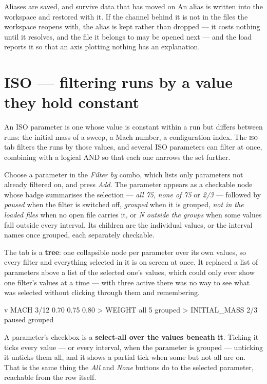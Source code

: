 \documentclass[11pt,a4paper,oneside]{report}
\newcommand{\tab}[1]{\textsc{#1}}
\begin{document}
\begin{aoenote}{Aliases are saved, and survive data that has moved on}
An alias is written into the workspace and restored with it. If the channel
behind it is not in the files the workspace reopens with, the alias is kept
rather than dropped --- it costs nothing until it resolves, and the file it
belongs to may be opened next --- and the load reports it so that an axis
plotting nothing has an explanation.
\end{aoenote}

\section{ISO --- filtering runs by a value they hold constant}
\label{sec:iso}

An ISO parameter is one whose value is constant within a run but differs between
runs: the initial mass of a sweep, a Mach number, a configuration index. The
\tab{iso} tab filters the runs by those values, and several ISO parameters can
filter at once, combining with a logical AND so that each one narrows the set
further.

Choose a parameter in the \emph{Filter by} combo, which lists only parameters not
already filtered on, and press \emph{Add}. The parameter appears as a checkable
node whose badge summarises the selection --- \emph{all 75}, \emph{none of 75} or
\emph{2/3} --- followed by \emph{paused} when the filter is switched off,
\emph{grouped} when it is grouped, \emph{not in the loaded files} when no open
file carries it, or \emph{N outside the groups} when some values fall outside
every interval. Its children are the individual values, or the interval names
once grouped, each separately checkable.

The tab is a \textbf{tree}: one collapsible node per parameter over its own
values, so every filter and everything selected in it is on screen at once. It
replaced a list of parameters above a list of the selected one's values, which
could only ever show one filter's values at a time --- with three active there
was no way to see what was selected without clicking through them and
remembering.

\begin{aoecode}
 v MACH      3/12
     0.70
     0.75
     0.80
 > WEIGHT    all 5   grouped
 > INITIAL_MASS   2/3   paused   grouped
\end{aoecode}

A parameter's checkbox is a \textbf{select-all over the values beneath it}.
Ticking it ticks every value --- or every interval, when the parameter is
grouped --- unticking it unticks them all, and it shows a partial tick when some
but not all are on. That is the same thing the \emph{All} and \emph{None}
buttons do to the selected parameter, reachable from the row itself.
\end{document}
